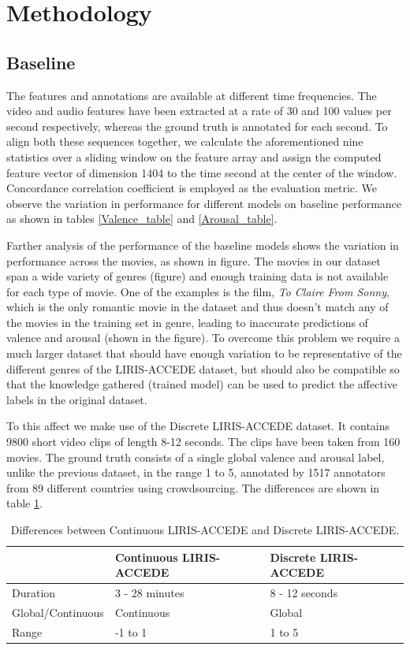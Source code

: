 \documentclass{article}
\begin{document}
\section{Methodology}


\subsection{Baseline}
The features and annotations are available at different time frequencies. The video and audio features have been extracted at a rate of 30 and 100 values per second respectively, whereas the ground truth is annotated for each second. To align both these sequences together, we calculate the aforementioned nine statistics over a sliding window on the feature array and assign the computed feature vector of dimension 1404 to the time second at the center of the window. Concordance correlation coefficient is employed as the evaluation metric. We observe the variation in performance for different models on baseline performance as shown in tables \ref{Valence_table} and \ref{Arousal_table}. 

\indent Farther analysis of the performance of the baseline models shows the variation in performance across the movies, as shown in figure. The movies in our dataset span a wide variety of genres (figure) and enough training data is not available for each type of movie. One of the examples is the film, \textit{To Claire From Sonny}, which is the only romantic movie in the dataset and thus doesn't match any of the movies in the training set in genre, leading to inaccurate predictions of valence and arousal (shown in the figure). To overcome this problem we require a much larger dataset that should have enough variation to be representative of the different genres of the LIRIS-ACCEDE dataset, but should also be compatible so that the knowledge gathered (trained model) can be used to predict the affective labels in the original dataset.

\indent To this affect we make use of the Discrete LIRIS-ACCEDE dataset. It contains 9800 short video clips of length 8-12 seconds. The clips have been taken from 160 movies. The ground truth consists of a single global valence and arousal label, unlike the previous dataset, in the range 1 to 5, annotated by 1517 annotators from 89 different countries using crowdsourcing. The differences are shown in table \ref{differences}.

\begin{table}[h]
\centering
\begin{tabular}{|l|p{2.2cm}|p{2.2cm}|}
\hline
				& Continuous LIRIS-ACCEDE	& Discrete LIRIS-ACCEDE \\ \hline
Duration			& 3 - 28 minutes			& 8 - 12 seconds		\\ \hline	
Global/Continuous	& Continuous				& Global 				\\ \hline
Range			& -1 to 1					& 1 to 5				\\ \hline
\end{tabular}
\caption{Differences between Continuous LIRIS-ACCEDE and Discrete LIRIS-ACCEDE.}
\label{differences}
\end{table}
\end{document}
